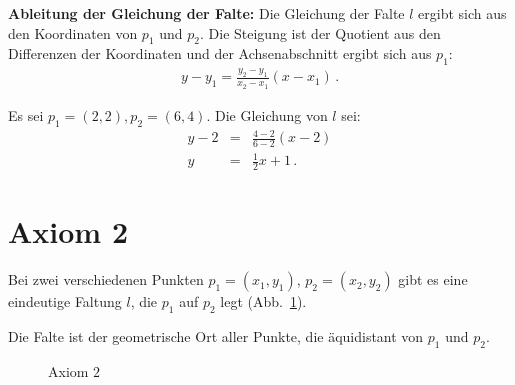 \textbf{Ableitung der Gleichung der Falte:}
Die Gleichung der Falte $l$ ergibt sich aus den Koordinaten von $p_1$ und $p_2$. Die Steigung ist der Quotient aus den Differenzen der Koordinaten und der Achsenabschnitt ergibt sich aus $p_1$:
\begin{align}
y - y_1 = \frac{y_2-y_1}{x_2-x_1}(x-x_1)\,.
\end{align}

\begin{example}
Es sei $p_1=(2,2), p_2=(6,4)$. Die Gleichung von $l$ sei:
\begin{eqnarray*}
y-2&=&\frac{4-2}{6-2}(x-2)\\
y&=&\frac{1}{2}x+1\,.
\end{eqnarray*}
\end{example}



\section{Axiom 2}\label{s.ax2}

\begin{axiom}
Bei zwei verschiedenen Punkten $p_1=(x_1,y_1)$, $p_2=(x_2,y_2)$ gibt es eine eindeutige Faltung $l$, die $p_1$ auf $p_2$ legt (Abb.~\ref{f.origami-axiom2}).
\end{axiom}

Die Falte ist der geometrische Ort aller Punkte, die äquidistant von $p_1$ und $p_2$.

\begin{figure}[ht]
\begin{center}
\end{center}
\caption{Axiom $2$}\label{f.origami-axiom2}
\end{figure}

